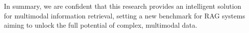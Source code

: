 \documentclass{svproc}
\begin{document}
In summary, we are confident that this research provides an intelligent solution for multimodal information retrieval, setting a new benchmark for RAG systems aiming to unlock the full potential of complex, multimodal data.











\end{document}
